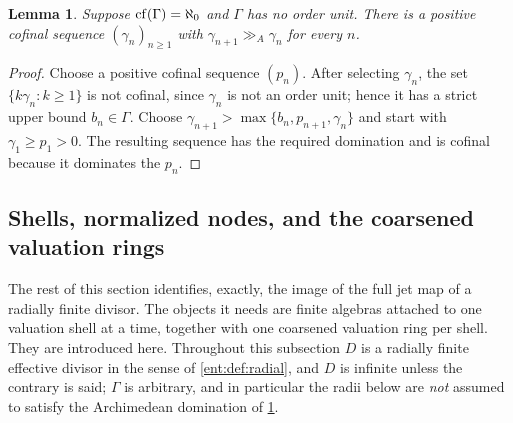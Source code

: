 \documentclass[11pt]{article}
\theoremstyle{plain}
\newtheorem{lemma}[lemma]{Lemma}
\theoremstyle{plain}
\theoremstyle{plain}
\theoremstyle{definition}
\theoremstyle{definition}
\theoremstyle{definition}
\theoremstyle{definition}
\theoremstyle{remark}
\newcommand{\ggA}{\mathrel{\gg_{\!A}}}
\begin{document}
\begin{lemma}\label{ent:lem:escaping-classes}
Suppose $\operatorname{cf}(\Gamma)=\aleph_0$ and $\Gamma$ has no order unit. There is a
positive cofinal sequence $(\gamma_n)_{n\ge1}$ with
$\gamma_{n+1}\ggA\gamma_n$ for every $n$.
\end{lemma}
\begin{proof}
Choose a positive cofinal sequence $(p_n)$. After selecting $\gamma_n$, the
set $\{k\gamma_n:k\ge1\}$ is not cofinal, since $\gamma_n$ is not an order
unit; hence it has a strict upper bound $b_n\in\Gamma$. Choose
$\gamma_{n+1}>\max\{b_n,p_{n+1},\gamma_n\}$ and start with
$\gamma_1\ge p_1>0$. The resulting sequence has the required domination and
is cofinal because it dominates the $p_n$.
\end{proof}

\subsection{Shells, normalized nodes, and the coarsened valuation rings}
\label{ent:subsec:shells}
The rest of this section identifies, exactly, the image of the full jet map
of a radially finite divisor. The objects it needs are finite algebras
attached to one valuation shell at a time, together with one coarsened
valuation ring per shell. They are introduced here. Throughout this
subsection $D$ is a radially finite effective divisor in the sense of
\cref{ent:def:radial}, and $D$ is infinite unless the contrary is said;
$\Gamma$ is arbitrary, and in particular the radii below are \emph{not}
assumed to satisfy the Archimedean domination of
\cref{ent:lem:escaping-classes}.
\end{document}
